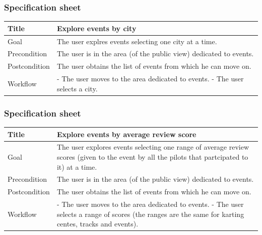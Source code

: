 \documentclass{beamer}
\begin{document}
\begin{frame}
    \frametitle{Specification sheet}
    \begin{table}
        \tiny
        \begin{tabular}{|p{2cm}|p{6cm}|}
        \hline
        Title & \textbf{Explore events by city} \\
        \hline
        Goal & The user explres events selecting one city at a time. \\
        \hline
        Precondition & The user is in the area (of the public view) dedicated to events.\\
        \hline
        Postcondition & The user obtains the list of events from which he can move on.\\
        \hline
        Workflow &
        - The user moves to the area dedicated to events. \newline
        - The user selects a city. \\
        \hline
        \end{tabular}
\end{table}
\end{frame}


\begin{frame}
    \frametitle{Specification sheet}
    \begin{table}
        \tiny
        \begin{tabular}{|p{2cm}|p{6cm}|}
        \hline
        Title & \textbf{Explore events by average review score} \\
        \hline
        Goal & The user explores events selecting one range of average review scores (given to the event by all the pilots
        that partcipated to it) at a time. \\
        \hline
        Precondition & The user is in the area (of the public view) dedicated to events.\\
        \hline
        Postcondition & The user obtains the list of events from which he can move on.\\
        \hline
        Workflow &
        - The user moves to the area dedicated to events. \newline
        - The user selects a range of scores (the ranges are the same for karting centes, tracks and events). \\
        \hline
        \end{tabular}
\end{table}
\end{frame}
\end{document}
